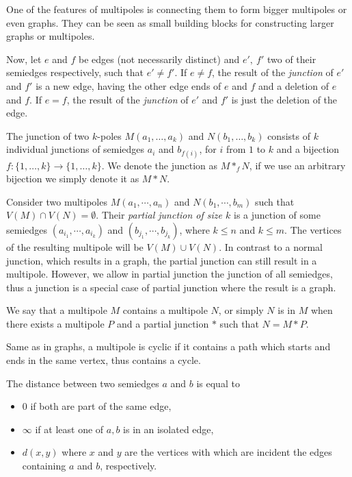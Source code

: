 \documentclass[12pt, twoside]{book}
\begin{document}
One of the features of multipoles is connecting them to form bigger multipoles or even graphs. They can be seen as small building blocks for constructing larger graphs or multipoles. 

Now, let $e$ and $f$ be edges (not necessarily distinct) and $e',~f'$ two of their semiedges respectively, such that $e'\neq f'$. If $e\neq f$, the result of the \textit{junction} of $e'$ and $f'$ is a new edge, having the other edge ends of $e$ and $f$ and a deletion of $e$ and $f$. If $e=f$, the result of the \textit{junction} of $e'$ and $f'$ is just the deletion of the edge.

The junction of two $k$-poles $M(a_1,\dots,a_k)$ and $N(b_1,\dots,b_k)$ consists of $k$ individual junctions of semiedges $a_i$ and $b_{f(i)}$, for $i$ from $1$ to $k$ and a bijection $f:\{1,\dots,k\}\rightarrow\{1,\dots,k\}$. We denote the junction as $M*_fN$, if we use an arbitrary bijection we simply denote it as $M*N$.

Consider two multipoles $M(a_1,\cdots,a_n)$ and $N(b_1,\cdots,b_m)$ such that $V(M)\cap V(N)=\emptyset$. Their \textit{partial junction of size $k$} is a junction of some semiedges $(a_{i_1},\cdots, a_{i_k})$ and $(b_{j_1},\cdots, b_{j_k})$, where $k\leq n$ and $k\leq m$. The vertices of the resulting multipole will be $V(M)\cup V(N)$. In contrast to a normal junction, which results in a graph, the partial junction can still result in a multipole. However, we allow in partial junction the junction of all semiedges, thus a junction is a special case of partial junction where the result is a graph.


We say that a multipole $M$ contains a multipole $N$, or simply $N$ is in $M$ when there exists a multipole $P$ and a partial junction $*$ such that $N=M*P$. 

Same as in graphs, a multipole is cyclic if it contains a path which starts and ends in the same vertex, thus contains a cycle.

The distance between two semiedges $a$ and $b$ is equal to
\begin{itemize}
	\item 0 if both are part of the same edge,
	\item $\infty$ if at least one of $a,b$ is in an isolated edge,
	\item $d(x,y)$ where $x$ and $y$ are the vertices with which are incident the edges containing $a$ and $b$, respectively.
\end{itemize}
\end{document}
